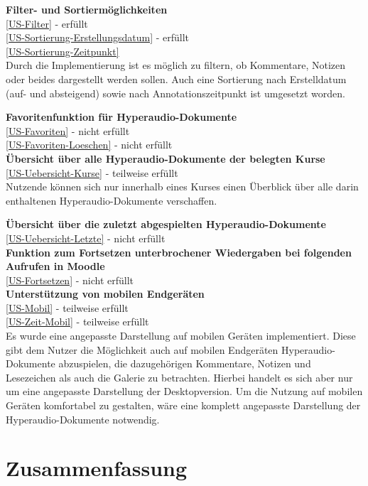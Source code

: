 \textbf{Filter- und Sortiermöglichkeiten}\\
\ref{US-Filter} - erfüllt\\
\ref{US-Sortierung-Erstellungsdatum} - erfüllt\\
\ref{US-Sortierung-Zeitpunkt}\\
Durch die Implementierung ist es möglich zu filtern, ob Kommentare, Notizen oder beides dargestellt werden sollen. Auch eine Sortierung nach Erstelldatum (auf- und absteigend) sowie nach Annotationszeitpunkt ist umgesetzt worden.

\textbf{Favoritenfunktion für Hyperaudio-Dokumente}\\
\ref{US-Favoriten} - nicht erfüllt\\
\ref{US-Favoriten-Loeschen} - nicht erfüllt\\

\textbf{Übersicht über alle Hyperaudio-Dokumente der belegten Kurse}\\
\ref{US-Uebersicht-Kurse} - teilweise erfüllt\\
Nutzende können sich nur innerhalb eines Kurses einen Überblick über alle darin enthaltenen Hyperaudio-Dokumente verschaffen.


\textbf{Übersicht über die zuletzt abgespielten Hyperaudio-Dokumente}\\
\ref{US-Uebersicht-Letzte} - nicht erfüllt\\


\textbf{Funktion zum Fortsetzen unterbrochener Wiedergaben bei folgenden Aufrufen in Moodle}\\
\ref{US-Fortsetzen} - nicht erfüllt\\


\textbf{Unterstützung von mobilen Endgeräten}\\
\ref{US-Mobil} - teilweise erfüllt\\
\ref{US-Zeit-Mobil}  - teilweise erfüllt\\
Es wurde eine angepasste Darstellung auf mobilen Geräten implementiert. Diese gibt dem Nutzer die Möglichkeit auch auf mobilen Endgeräten Hyperaudio-Dokumente abzuspielen, die dazugehörigen Kommentare, Notizen und Lesezeichen als auch die Galerie zu betrachten. Hierbei handelt es sich aber nur um eine angepasste Darstellung der Desktopversion. Um die Nutzung auf mobilen Geräten komfortabel zu gestalten, wäre eine komplett angepasste Darstellung der Hyperaudio-Dokumente notwendig.


\section{Zusammenfassung}


